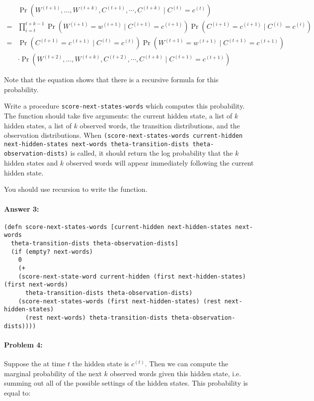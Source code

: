 \documentclass[12pt, letterpaper]{article}
\begin{document}
\begin{align*}
&\Pr(W^{(t+1)},\dots,W^{(t+k)},C^{(t+1)},\cdots,C^{(t+k)} \mid C^{(t)}=c^{(t)} )\\
=&\prod_{i=t}^{t+k-1} \Pr(W^{(i+1)}=w^{(i+1)} \mid C^{(i+1)}=c^{(i+1)}) \Pr(C^{(i+1)} =c^{(i+1)}\mid C^{(i)}=c^{(i)}) \\
= & \Pr(C^{(t+1)} =c^{(t+1)}\mid C^{(t)}=c^{(t)}) \Pr(W^{(t+1)} =w^{(t+1)}\mid C^{(t+1)}=c^{(t+1)}) \\
&\cdot \Pr(W^{(t+2)},\dots,W^{(t+k)},C^{(t+2)},\cdots,C^{(t+k)} \mid C^{(t+1)}=c^{(t+1)} )
\end{align*}

Note that the equation shows that there is a recursive formula for
this probability.

Write a procedure \texttt{score-next-states-words} which computes this
probability. The function should take five arguments: the current
hidden state, a list of $k$ hidden states, a list of $k$ observed
words, the transition distributions, and the observation
distributions. When \texttt{(score-next-states-words current-hidden
  next-hidden-states next-words theta-transition-dists
  theta-observation-dists)} is called, it should return the log
probability that the $k$ hidden states and $k$ observed words will
appear immediately following the current hidden state.

You should use recursion to write the function. 

\paragraph{Answer 3:}\begin{lstlisting}
(defn score-next-states-words [current-hidden next-hidden-states next-words 
  theta-transition-dists theta-observation-dists]
  (if (empty? next-words)
    0
    (+ 
    (score-next-state-word current-hidden (first next-hidden-states) (first next-words) 
      theta-transition-dists theta-observation-dists)
    (score-next-states-words (first next-hidden-states) (rest next-hidden-states) 
      (rest next-words) theta-transition-dists theta-observation-dists))))
\end{lstlisting}

\hrulefill
\paragraph{Problem 4:}

Suppose the at time $t$ the hidden state is $c^{(t)}$. Then we can
compute the marginal probability of the next $k$ observed words
given this hidden state, i.e. summing out all of the possible settings
of the hidden states. This probability is equal to:
\end{document}
